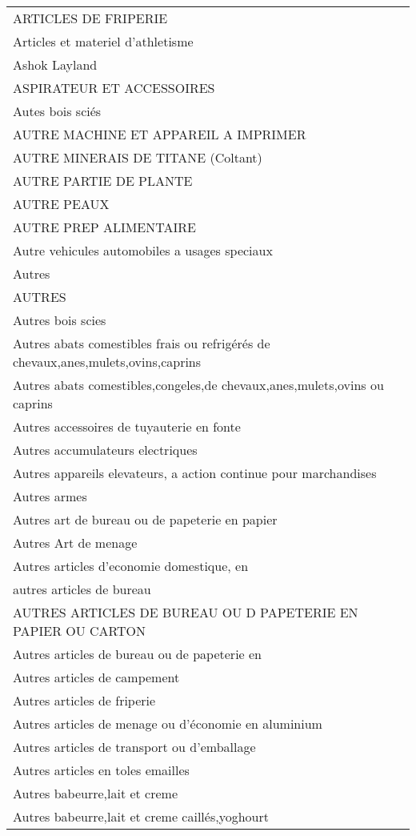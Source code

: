 \documentclass[
]{book}
\begin{document}
\begin{longtable}[t]{l}
\addlinespace
ARTICLES DE FRIPERIE\\
Articles et materiel d'athletisme\\
Ashok Layland\\
ASPIRATEUR ET ACCESSOIRES\\
Autes bois sciés\\
\addlinespace
AUTRE MACHINE ET APPAREIL A IMPRIMER\\
AUTRE MINERAIS DE TITANE (Coltant)\\
AUTRE PARTIE DE PLANTE\\
AUTRE PEAUX\\
AUTRE PREP ALIMENTAIRE\\
\addlinespace
Autre vehicules automobiles a usages speciaux\\
Autres\\
AUTRES\\
Autres  bois scies\\
Autres abats comestibles frais ou refrigérés de chevaux,anes,mulets,ovins,caprins\\
\addlinespace
Autres abats comestibles,congeles,de chevaux,anes,mulets,ovins ou caprins\\
Autres accessoires de tuyauterie en fonte\\
Autres accumulateurs electriques\\
Autres appareils elevateurs, a action continue pour marchandises\\
Autres armes\\
\addlinespace
Autres art de bureau ou de papeterie en papier\\
Autres Art de menage\\
Autres articles d'economie domestique, en\\
autres articles de bureau\\
AUTRES ARTICLES DE BUREAU OU D PAPETERIE EN PAPIER OU CARTON\\
\addlinespace
Autres articles de bureau ou de papeterie en\\
Autres articles de campement\\
Autres articles de friperie\\
Autres articles de menage ou d'économie en aluminium\\
Autres articles de transport ou d'emballage\\
\addlinespace
Autres articles en toles emailles\\
Autres babeurre,lait et creme\\
Autres babeurre,lait et creme caillés,yoghourt\\

\end{longtable}
\end{document}
